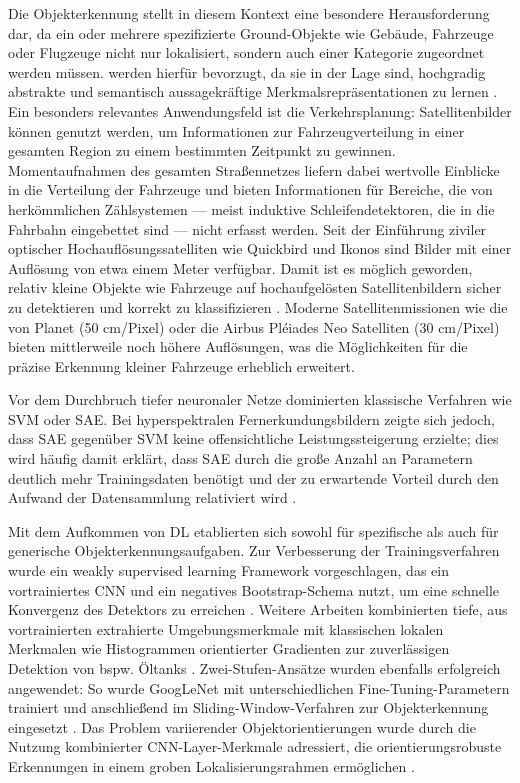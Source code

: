 Die Objekterkennung stellt in diesem Kontext eine besondere Herausforderung dar, da ein oder mehrere spezifizierte Ground-Objekte wie Gebäude, Fahrzeuge oder Flugzeuge nicht nur lokalisiert, sondern auch einer Kategorie zugeordnet werden müssen.  werden hierfür bevorzugt, da sie in der Lage sind, hochgradig abstrakte und semantisch aussagekräftige Merkmalsrepräsentationen zu lernen \cite{Zhu2017}. Ein besonders relevantes Anwendungsfeld ist die Verkehrsplanung: Satellitenbilder können genutzt werden, um Informationen zur Fahrzeugverteilung in einer gesamten Region zu einem bestimmten Zeitpunkt zu gewinnen. Momentaufnahmen des gesamten Straßennetzes liefern dabei wertvolle Einblicke in die Verteilung der Fahrzeuge und bieten Informationen für Bereiche, die von herkömmlichen Zählsystemen — meist induktive Schleifendetektoren, die in die Fahrbahn eingebettet sind — nicht erfasst werden. Seit der Einführung ziviler optischer Hochauflösungssatelliten wie Quickbird und Ikonos sind Bilder mit einer Auflösung von etwa einem Meter verfügbar. Damit ist es möglich geworden, relativ kleine Objekte wie Fahrzeuge auf hochaufgelösten Satellitenbildern sicher zu detektieren und korrekt zu klassifizieren \cite{Eikvil2009}. Moderne Satellitenmissionen wie die von Planet (50 cm/Pixel) \cite{planet_labs} oder die Airbus Pléiades Neo Satelliten (30 cm/Pixel) \cite{airbus_neo} bieten mittlerweile noch höhere Auflösungen, was die Möglichkeiten für die präzise Erkennung kleiner Fahrzeuge erheblich erweitert.

Vor dem Durchbruch tiefer neuronaler Netze dominierten klassische Verfahren wie \Acrfull{SVM} oder \Acrfull{SAE}. Bei hyperspektralen Fernerkundungsbildern zeigte sich jedoch, dass \Acrshort{SAE} gegenüber \Acrshort{SVM} keine offensichtliche Leistungssteigerung erzielte; dies wird häufig damit erklärt, dass \acrshort{SAE} durch die große Anzahl an Parametern deutlich mehr Trainingsdaten benötigt und der zu erwartende Vorteil durch den Aufwand der Datensammlung relativiert wird \cite{Liu2017}.

Mit dem Aufkommen von \Acrlong{DL} etablierten sich  sowohl für spezifische als auch für generische Objekterkennungsaufgaben. Zur Verbesserung der Trainingsverfahren wurde ein weakly supervised learning Framework vorgeschlagen, das ein vortrainiertes \acrshort{CNN} und ein negatives Bootstrap-Schema nutzt, um eine schnelle Konvergenz des Detektors zu erreichen \cite{Zhou2016}. Weitere Arbeiten kombinierten tiefe, aus vortrainierten  extrahierte Umgebungsmerkmale mit klassischen lokalen Merkmalen wie Histogrammen orientierter Gradienten \cite{Dalal2005} zur zuverlässigen Detektion von bspw. Öltanks \cite{Zhang2015}. Zwei-Stufen-Ansätze wurden ebenfalls erfolgreich angewendet: So wurde GoogLeNet mit unterschiedlichen Fine-Tuning-Parametern trainiert und anschließend im Sliding-Window-Verfahren zur Objekterkennung eingesetzt \cite{Sevo2016}. Das Problem variierender Objektorientierungen wurde durch die Nutzung kombinierter \acrshort{CNN}-Layer-Merkmale adressiert, die orientierungsrobuste Erkennungen in einem groben Lokalisierungsrahmen ermöglichen \cite{Zhu2015}.

